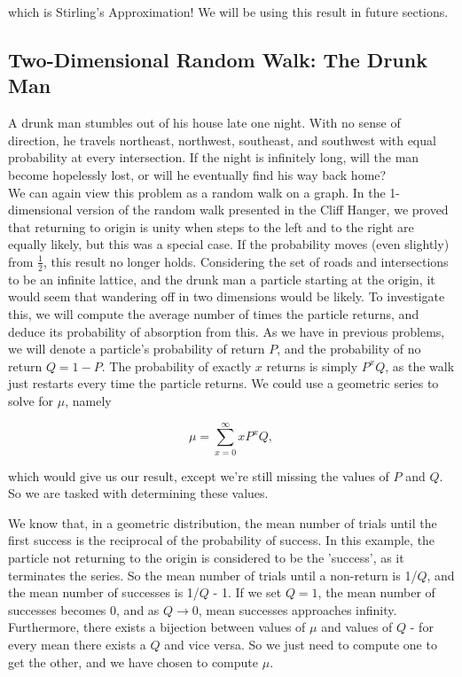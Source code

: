 \documentclass[11pt]{article}
\begin{document}
\noindent which is Stirling's Approximation! We will be using this result in future sections.
\cite{khamsi}





\subsection{Two-Dimensional Random Walk: The Drunk Man}
\medskip
\indent \indent A drunk man stumbles out of his house late one night. With no sense of direction, he travels northeast, northwest, southeast, and southwest with equal probability at every intersection. If the night is infinitely long, will the man become hopelessly lost, or will he eventually find his way back home?
\\

We can again view this problem as a random walk on a graph. In the 1-dimensional version of the random walk presented in the Cliff Hanger, we proved that returning to origin is unity when steps to the left and to the right are equally likely, but this was a special case. If the probability moves (even slightly) from $\frac{1}{2}$, this result no longer holds. Considering the set of roads and intersections to be an infinite lattice, and the drunk man a particle starting at the origin, it would seem that wandering off in two dimensions would be likely. To investigate this, we will compute the average number of times the particle returns, and deduce its probability of absorption from this. As we have in previous problems, we will denote a particle's probability of return $P$, and the probability of no return $Q = 1 - P$. The probability of exactly $x$ returns is simply $P^{x}Q$, as the walk just restarts every time the particle returns. We could use a geometric series to solve for $\mu$, namely

\begin{equation}
\mu = \sum_{x=0}^{\infty} xP^{x}Q,
\end{equation}

which would give us our result, except we're still missing the values of $P$ and $Q$. So we are tasked with determining these values. 

We know that, in a geometric distribution, the mean number of trials until the first success is the reciprocal of the probability of success. In this example, the particle not returning to the origin is considered to be the 'success', as it terminates the series. So the mean number of trials until a non-return is 1/$Q$, and the mean number of successes is 1/$Q$ - 1. If we set $Q = 1$, the mean number of successes becomes 0, and as $Q \to 0$, mean successes approaches infinity. Furthermore, there exists a bijection between values of $\mu$ and values of $Q$ - for every mean there exists a $Q$ and vice versa. So we just need to compute one to get the other, and we have chosen to compute $\mu$.
\end{document}
